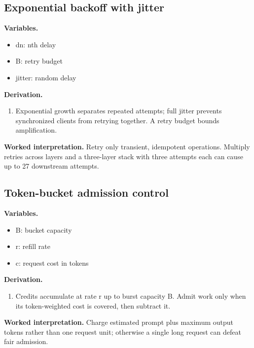 \subsection{Exponential backoff with jitter}
\textbf{Variables.}\begin{itemize}
\item dn: nth delay
\item B: retry budget
\item jitter: random delay
\end{itemize}
\textbf{Derivation.}\begin{derivation}\begin{enumerate}
\item Exponential growth separates repeated attempts; full jitter prevents synchronized clients from retrying together. A retry budget bounds amplification.
\end{enumerate}\end{derivation}
\textbf{Worked interpretation.} Retry only transient, idempotent operations. Multiply retries across layers and a three-layer stack with three attempts each can cause up to 27 downstream attempts.
\subsection{Token-bucket admission control}
\textbf{Variables.}\begin{itemize}
\item B: bucket capacity
\item r: refill rate
\item c: request cost in tokens
\end{itemize}
\textbf{Derivation.}\begin{derivation}\begin{enumerate}
\item Credits accumulate at rate r up to burst capacity B. Admit work only when its token-weighted cost is covered, then subtract it.
\end{enumerate}\end{derivation}
\textbf{Worked interpretation.} Charge estimated prompt plus maximum output tokens rather than one request unit; otherwise a single long request can defeat fair admission.
